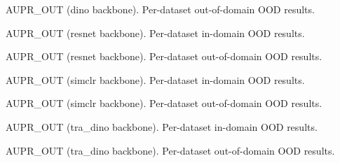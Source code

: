 \documentclass[runningheads]{llncs}
\begin{document}
\begin{table}[htbp]
  \centering
  \caption{AUPR\_OUT (dino backbone). Per-dataset out-of-domain OOD results.}
  \label{tab:supp:extended:auprout:dino:out}
  \small
  \resizebox{\linewidth}{!}{}
\end{table}

\begin{table}[htbp]
  \centering
  \caption{AUPR\_OUT (resnet backbone). Per-dataset in-domain OOD results.}
  \label{tab:supp:extended:auprout:resnet:in}
  \small
  \resizebox{\linewidth}{!}{}
\end{table}

\begin{table}[htbp]
  \centering
  \caption{AUPR\_OUT (resnet backbone). Per-dataset out-of-domain OOD results.}
  \label{tab:supp:extended:auprout:resnet:out}
  \small
  \resizebox{\linewidth}{!}{}
\end{table}

\begin{table}[htbp]
  \centering
  \caption{AUPR\_OUT (simclr backbone). Per-dataset in-domain OOD results.}
  \label{tab:supp:extended:auprout:simclr:in}
  \small
  \resizebox{\linewidth}{!}{}
\end{table}

\begin{table}[htbp]
  \centering
  \caption{AUPR\_OUT (simclr backbone). Per-dataset out-of-domain OOD results.}
  \label{tab:supp:extended:auprout:simclr:out}
  \small
  \resizebox{\linewidth}{!}{}
\end{table}

\begin{table}[htbp]
  \centering
  \caption{AUPR\_OUT (tra\_dino backbone). Per-dataset in-domain OOD results.}
  \label{tab:supp:extended:auprout:tra_dino:in}
  \small
  \resizebox{\linewidth}{!}{}
\end{table}

\begin{table}[htbp]
  \centering
  \caption{AUPR\_OUT (tra\_dino backbone). Per-dataset out-of-domain OOD results.}
  \label{tab:supp:extended:auprout:tra_dino:out}
  \small
  \resizebox{\linewidth}{!}{}
\end{table}
\end{document}
